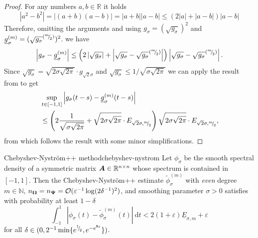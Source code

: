 \documentclass[12pt]{article}
\begin{document}
\begin{proof}
    For any numbers $a, b \in \mathbb{R}$ it holds
    \begin{equation}
    | a^2 - b^2 | = | (a + b)(a - b) | = | a + b | | a - b | \leq (2 | a | + | a - b |)  | a - b |
    \end{equation}
    Therefore, omitting the arguments and using $g_{\sigma} = (\sqrt{g_{\sigma}})^2$ and $\underline{g}_{\sigma}^{(m)} = (\sqrt{g_{\sigma}}^{({}^{m}{\mskip -5mu/\mskip -3mu}_{2})})^2$.
    we have
    \begin{equation}
        \left| g_{\sigma} - \underline{g}_{\sigma}^{(m)} \right| \leq \left( 2 \left| \sqrt{g_{\sigma}} \right| + \left| \sqrt{g_{\sigma}} - \sqrt{g_{\sigma}}^{({}^{m}{\mskip -5mu/\mskip -3mu}_{2})} \right| \right) \left| \sqrt{g_{\sigma}} - \sqrt{g_{\sigma}}^{({}^{m}{\mskip -5mu/\mskip -3mu}_{2})} \right|.
    \end{equation}
    Since $\sqrt{g_{\sigma}} = \sqrt{2 \sigma \sqrt{2 \pi}} \cdot g_{\sqrt{2}\sigma}$ and $\sqrt{g_{\sigma}} \leq 1/\sqrt{\sigma \sqrt{2 \pi}}$ we can apply the result from  to get
    \begin{align}
        &\sup_{t \in [-1, 1]} \left| g_{\sigma}(t - s) - \underline{g}_{\sigma}^{(m)}(t - s) \right| \notag \\
        &\leq \left( 2 \frac{1}{\sqrt{ \sigma \sqrt{2\pi}}} + \sqrt{2 \sigma \sqrt{2 \pi}} \cdot E_{\sqrt{2}\sigma, {}^{m}{\mskip -5mu/\mskip -3mu}_{2}}\right)\sqrt{2 \sigma \sqrt{2 \pi}} \cdot E_{\sqrt{2}\sigma, {}^{m}{\mskip -5mu/\mskip -3mu}_{2}},
    \end{align}
    from which follows the result with some minor simplifications.
\end{proof}

\begin{theorem}{Chebyshev-Nyström++ method}{chebyshev-nystrom}
    Let $\phi_{\sigma}$ be the smooth spectral density of a symmetric matrix $\boldsymbol{A} \in \mathbb{R}^{n \times n}$ whose spectrum is contained in $[-1, 1]$. Then the Chebyshev-Nyström++ estimate $\widetilde{\phi}_{\sigma}^{(m)}$ with \emph{even} degree $m \in \mathbb{N}$, $n_{\boldsymbol{\Omega}} = n_{\boldsymbol{\Psi}} = \mathcal{O}(\varepsilon^{-1}\log(2\delta^{-1})^2)$, and smoothing parameter $\sigma > 0$ satisfies with probability at least $1 - \delta$
    \begin{equation}
        \int_{-1}^{1} \left| \phi_{\sigma}(t) - \widetilde{\phi}_{\sigma}^{(m)}(t) \right|~\mathrm{d}t < 2 (1 + \varepsilon) \underline{E}_{\sigma, m} + \varepsilon
        \label{equ:chebyshev-nystrom-error}
    \end{equation}
    for all $\delta \in (0, 2^{-1} \min\{e^{{}^{1}{\mskip -5mu/\mskip -3mu}_{2}}, e^{-e^{8\varepsilon}}\})$.
\end{theorem}
\end{document}

